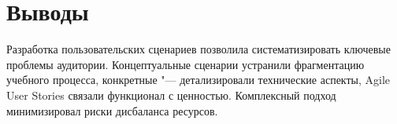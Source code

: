 \documentclass{bsuir}
\begin{document}
\section{Выводы}

Разработка пользовательских сценариев позволила систематизировать ключевые
проблемы аудитории. Концептуальные сценарии устранили фрагментацию учебного
процесса, конкретные "--- детализировали технические аспекты, Agile User Stories
связали функционал с ценностью. Комплексный подход минимизировал риски
дисбаланса ресурсов.
\end{document}
